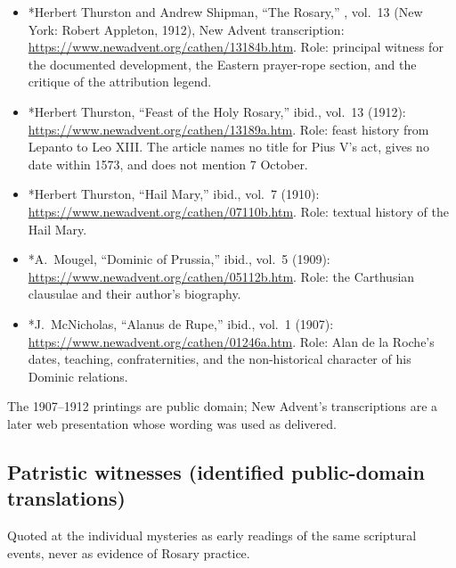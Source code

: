 \begin{itemize}
\item *Herbert Thurston and Andrew Shipman, ``The Rosary,'' , vol.~13 (New York: Robert Appleton, 1912),
New Advent transcription:
\url{https://www.newadvent.org/cathen/13184b.htm}. Role: principal
witness for the documented development, the Eastern prayer-rope
section, and the critique of the attribution legend.
\item *Herbert Thurston, ``Feast of the Holy Rosary,'' ibid., vol.~13
(1912): \url{https://www.newadvent.org/cathen/13189a.htm}. Role: feast
history from Lepanto to Leo XIII. The article names no title for Pius V's
act, gives no date within 1573, and does not mention 7 October.
\item *Herbert Thurston, ``Hail Mary,'' ibid., vol.~7 (1910):
\url{https://www.newadvent.org/cathen/07110b.htm}. Role: textual
history of the Hail Mary.
\item *A.~Mougel, ``Dominic of Prussia,'' ibid., vol.~5 (1909):
\url{https://www.newadvent.org/cathen/05112b.htm}. Role: the
Carthusian clausulae and their author's biography.
\item *J.~McNicholas, ``Alanus de Rupe,'' ibid., vol.~1 (1907):
\url{https://www.newadvent.org/cathen/01246a.htm}. Role: Alan de la
Roche's dates, teaching, confraternities, and the non-historical
character of his Dominic relations.
\end{itemize}

The 1907--1912 printings are public domain; New Advent's transcriptions
are a later web presentation whose wording was used as delivered.

\subsection*{Patristic witnesses (identified public-domain translations)}

Quoted at the individual mysteries as early readings of the same
scriptural events, never as evidence of Rosary practice.

